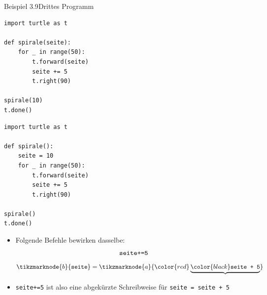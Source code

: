 \begin{frame}[fragile]{Beispiel 3.9}{Drittes Programm}
\begin{minipage}[c]{.49\linewidth}
    \begin{lstlisting}
import turtle as t

def spirale(seite):
    for _ in range(50):
        t.forward(seite)
        seite += 5
        t.right(90)

spirale(10)    
t.done()
\end{lstlisting}
\end{minipage}\hfill
\begin{minipage}[c]{.49\linewidth}
    \begin{lstlisting}
import turtle as t

def spirale():
    seite = 10
    for _ in range(50):
        t.forward(seite)
        seite += 5
        t.right(90)

spirale()
t.done()
\end{lstlisting}
\end{minipage}

\begin{itemize}
    \item<2-> Folgende Befehle bewirken dasselbe:\\
    \scriptsize
\begin{equation}
    \text{\texttt{seite+=5}}
\end{equation}
\begin{equation}
    \tikzmarknode{b}{\text{\texttt{seite}}} =\tikzmarknode{a}{\color{red}\underbrace{\color{black}\text{\texttt{seite + 5}}}}
\end{equation}
\normalsize
    \item<3> \lstinline|seite+=5| ist also eine abgekürzte Schreibweise für \lstinline|seite = seite + 5|
    
\end{itemize}
\end{frame}

